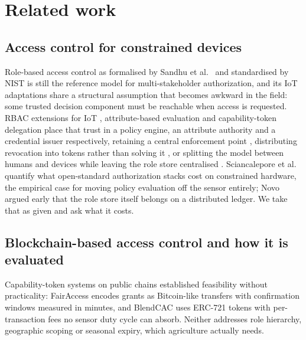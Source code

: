 \section{Related work}
\label{sec:related}

\subsection{Access control for constrained devices}

Role-based access control as formalised by Sandhu et al.\ \citep{sandhu1996rolebased} and standardised by NIST \citep{ferraiolo2001proposed} is still the reference model for multi-stakeholder authorization, and its IoT adaptations share a structural assumption that becomes awkward in the field: some trusted decision component must be reachable when access is requested. RBAC extensions for IoT \citep{ye2014efficient}, attribute-based evaluation \citep{hu2014guide,servos2017current,hernandez2013distributed} and capability-token delegation \citep{hernandez2013distributed} place that trust in a policy engine, an attribute authority and a credential issuer respectively, retaining a central enforcement point \citep{ye2014efficient,servos2017current}, distributing revocation into tokens rather than solving it \citep{hernandez2013distributed}, or splitting the model between humans and devices while leaving the role store centralised \citep{alshehri2016access}. Sciancalepore et al.\ \citep{sciancalepore2017oauthiot} quantify what open-standard authorization stacks cost on constrained hardware, the empirical case for moving policy evaluation off the sensor entirely; Novo \citep{novo2018blockchain} argued early that the role store itself belongs on a distributed ledger. We take that as given and ask what it costs.

\subsection{Blockchain-based access control and how it is evaluated}

Capability-token systems on public chains established feasibility without practicality: FairAccess \citep{ouaddah2016fairaccess} encodes grants as Bitcoin-like transfers with confirmation windows measured in minutes, and BlendCAC \citep{xu2018blendcac} uses ERC-721 tokens with per-transaction fees no sensor duty cycle can absorb. Neither addresses role hierarchy, geographic scoping or seasonal expiry, which agriculture actually needs.


